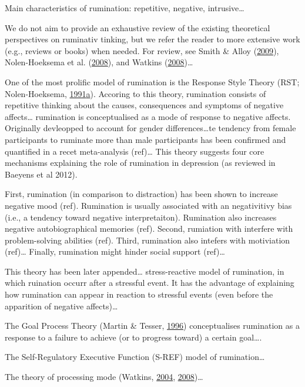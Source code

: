 \documentclass[a4paper,12pt,twoside,openright,oldfontcommands]{memoir}
\begin{document}
Main characteristics of rumination: repetitive, negative, intrusive\ldots{}

We do not aim to provide an exhaustive review of the existing theoretical perspectives on ruminativ tinking, but we refer the reader to more extensive work (e.g., reviews or books) when needed. For review, see Smith \& Alloy (\protect\hyperlink{ref-Smith2009}{2009}), Nolen-Hoeksema et al. (\protect\hyperlink{ref-Nolen-Hoeksema2008}{2008}), and Watkins (\protect\hyperlink{ref-Watkins2008}{2008})\ldots{}

One of the most prolific model of rumination is the Response Style Theory (RST; Nolen-Hoeksema, \protect\hyperlink{ref-nolen-hoeksema_responses_1991}{1991}\protect\hyperlink{ref-nolen-hoeksema_responses_1991}{a}). Accoring to this theory, rumination consists of repetitive thinking about the causes, consequences and symptoms of negative affects\ldots{} rumination is conceptualised as a mode of response to negative affects. Originally devleopped to account for gender differences\ldots te tendency from female participants to ruminate more than male participants has been confirmed and quantified in a recet meta-analysis (ref)\ldots{} This theory suggests four core mechanisms explaining the role of rumination in depression (as reviewed in Baeyens et al 2012).

First, rumination (in comparison to distraction) has been shown to increase negative mood (ref). Rumination is usually associated with an negativitivy bias (i.e., a tendency toward negative interpretaiton). Rumination also increases negative autobiographical memories (ref). Second, rumiation with interfere with problem-solving abilities (ref). Third, rumination also intefers with motiviation (ref)\ldots{} Finally, rumination might hinder social support (ref)\ldots{}

This theory has been later appended\ldots{} stress-reactive model of rumination, in which ruination occurr after a stressful event. It has the advantage of explaining how rumination can appear in reaction to stressful events (even before the apparition of negative affects)\ldots{}

The Goal Process Theory (Martin \& Tesser, \protect\hyperlink{ref-Martin}{1996}) conceptualises rumination as a response to a failure to achieve (or to progress toward) a certain goal\ldots.

The Self-Regulatory Executive Function (S-REF) model of rumination\ldots{}

The theory of processing mode (Watkins, \protect\hyperlink{ref-watkins_adaptive_2004}{2004}, \protect\hyperlink{ref-Watkins2008}{2008})\ldots{}
\end{document}
